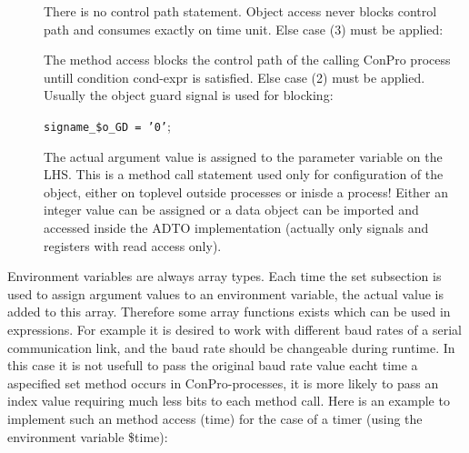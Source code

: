 \documentclass[a4paper,12pt,twoside,english]{article}
\begin{document}
\begin{description}
\begin{description}
\item[] $ $\\
There is no control path statement. Object access never blocks control path and consumes exactly on time unit. Else case (3) must be applied:

\item[] $ $\\
The method access  blocks the control path of the calling ConPro process untill condition cond-expr is satisfied. Else case (2) must be applied. Usually the
object guard signal is used for blocking:

{\tt signame\_\$o\_GD = '0'};


\item[] $ $\\
The actual argument value is assigned to the parameter variable on the LHS.  This is a method call statement used only for configuration of the object, either
on toplevel outside processes or inisde a process! Either an integer value can be assigned or a data object can be imported and accessed inside the ADTO
implementation (actually only signals and registers with read access only).


\end{description}
Environment variables are always array types. Each time the set subsection is used to assign argument values to an environment variable, the actual value is
added to this array. Therefore some array functions exists which can be used in expressions. For example it is desired to work with different baud rates of a
serial communication link, and the baud rate should be changeable during runtime. In this case it is not usefull to pass the original baud rate value eacht time
a aspecified set method occurs in ConPro-processes, it is more likely to pass an index value requiring much less bits to each method call.  Here is an example
to implement such an method access (time) for the case of a timer (using the environment variable \$time):


\end{description}
\end{document}
